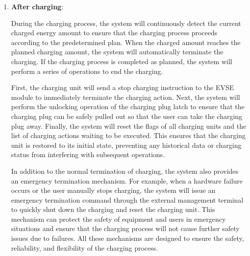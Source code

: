 \documentclass[
	english,
	ruledheaders=section,%
	class=report,%
	thesis={type=Report},%
	accentcolor=9c,%
	custommargins=true,%
	marginpar=false,%
	parskip=half-,%
	fontsize=11pt,%
	logofile={img/tuda_logo.pdf}, %
]{tudapub}
\begin{document}
\begin{enumerate}[label=\Alph*.]
    \item \textbf{After charging}:
    \label{item:afterCharging}

    During the charging process, the system will continuously detect the current charged energy amount to ensure that the charging process proceeds according to the predetermined plan. When the charged amount reaches the planned charging amount, the system will automatically terminate the charging. If the charging process is completed as planned, the system will perform a series of operations to end the charging.
    
    First, the charging unit will send a stop charging instruction to the EVSE module to immediately terminate the charging action. Next, the system will perform the unlocking operation of the charging plug latch to ensure that the charging plug can be safely pulled out so that the user can take the charging plug away. Finally, the system will reset the flags of all charging units and the list of charging actions waiting to be executed. This ensures that the charging unit is restored to its initial state, preventing any historical data or charging status from interfering with subsequent operations.


    In addition to the normal termination of charging, the system also provides an emergency termination mechanism. For example, when a hardware failure occurs or the user manually stops charging, the system will issue an emergency termination command through the external management terminal to quickly shut down the charging and reset the charging unit. This mechanism can protect the safety of equipment and users in emergency situations and ensure that the charging process will not cause further safety issues due to failures. All these mechanisms are designed to ensure the safety, reliability, and flexibility of the charging process.


\end{enumerate}
\end{document}
